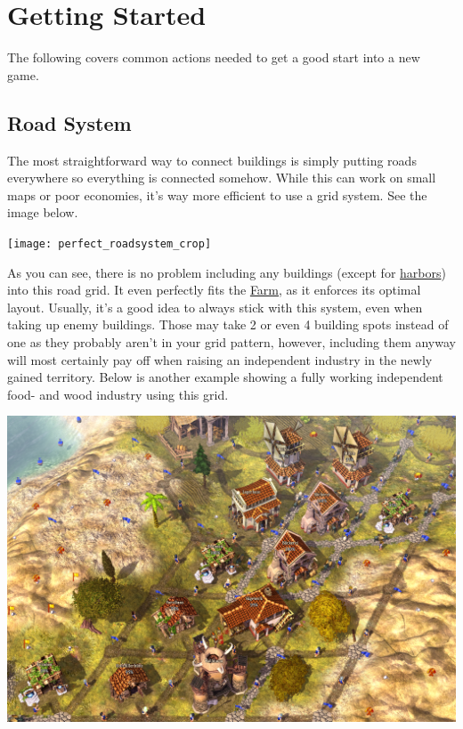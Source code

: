 \documentclass[12pt]{article}
\begin{document}
\section{Getting Started}
\label{sec:gettingstarted}

The following covers common actions needed to get a good start into a new game.

\subsection{Road System}
\label{sec:roadsystem}

The most straightforward way to connect buildings is simply putting roads everywhere so everything is connected somehow. While this can work on small maps or poor economies, it's way more efficient to use a grid system. See the image below.

\vspace{12pt}
\texttt{[image: perfect\_roadsystem\_crop]}
\vspace{0pt}

As you can see, there is no problem including any buildings (except for \hyperref[sec:harbor]{harbors}) into this road grid. It even perfectly fits the \hyperref[sec:farm]{Farm}, as it enforces its optimal layout. Usually, it's a good idea to always stick with this system, even when taking up enemy buildings. Those may take 2 or even 4 building spots instead of one as they probably aren't in your grid pattern, however, including them anyway will most certainly pay off when raising an independent industry in the newly gained territory. Below is another example showing a fully working independent food- and wood industry using this grid.

\vspace{12pt}
\includegraphics[width=\textwidth]{roadsystem_in_use_crop}
\end{document}
